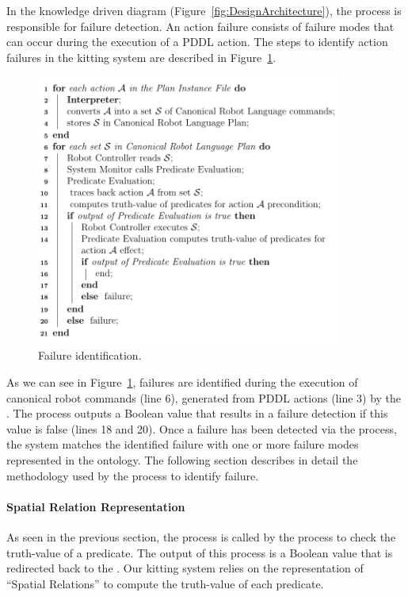 In the knowledge driven diagram (Figure~\ref{fig:DesignArchitecture}), the
 process is responsible for failure detection.
An action failure consists of failure modes that can occur during the execution of a
PDDL action. The steps to identify action failures in the kitting system are
described in Figure~\ref{fig:algo}.

\begin{figure}[h!t!]
  \centering
  \includegraphics[width=10cm]{images/algorithm.pdf}
  \caption{Failure identification.}
  \label{fig:algo}
\end{figure}

As we can see in Figure~\ref{fig:algo}, failures are identified during the execution of
canonical robot commands (line 6), generated from PDDL actions (line 3) by the .
The  process outputs a Boolean value that results in a
failure detection if this value is false (lines 18 and 20). Once a failure has been
detected via the  process, the system matches the
identified failure with one or more failure modes represented in the ontology. The
following section describes in detail the methodology used by the 
process to identify failure.


\paragraph{Spatial Relation Representation}
As seen in the previous section, the  process is called by
the  process to check the truth-value of a predicate. The output
of this process is a Boolean value that is redirected back to the .
Our kitting system relies on the representation of ``Spatial Relations''
to compute the truth-value of each predicate.

